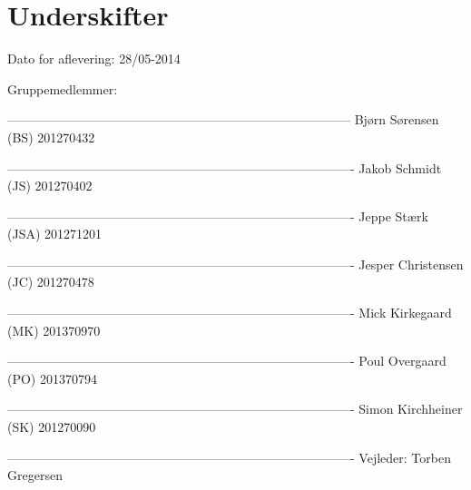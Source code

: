 \chapter*{Underskifter}

Dato for aflevering: 28/05-2014

Gruppemedlemmer:\newline


--------------------------------------------------------------------------------- \newline
Bjørn Sørensen (BS) 201270432\newline


----------------------------------------------------------------------------------\newline
Jakob Schmidt (JS) 201270402\newline


----------------------------------------------------------------------------------\newline
Jeppe Stærk (JSA) 201271201\newline


----------------------------------------------------------------------------------\newline
Jesper Christensen (JC) 201270478\newline


----------------------------------------------------------------------------------\newline
Mick Kirkegaard (MK) 201370970\newline


----------------------------------------------------------------------------------\newline
Poul Overgaard (PO) 201370794\newline


----------------------------------------------------------------------------------\newline
Simon Kirchheiner (SK) 201270090\newline









----------------------------------------------------------------------------------\newline
Vejleder: Torben Gregersen\newline
